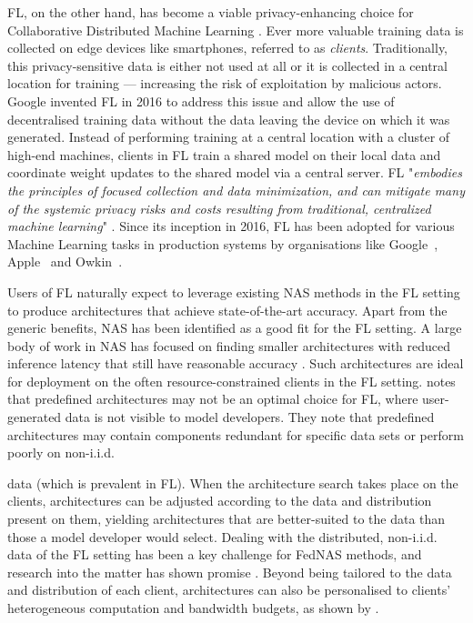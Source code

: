 FL, on the other hand, has become a viable privacy-enhancing choice for Collaborative Distributed Machine Learning \cite{cdml_2024}. Ever more valuable training data is collected on edge devices like smartphones, referred to as \textit{clients}. Traditionally, this privacy-sensitive data is either not used at all or it is collected in a central location for training — increasing the risk of exploitation by malicious actors. Google invented FL in 2016 to address this issue and allow the use of decentralised training data without the data leaving the device on which it was generated. Instead of performing training at a central location with a cluster of high-end machines, clients in FL train a shared model on their local data and coordinate weight updates to the shared model via a central server. FL "\textit{embodies the principles of focused collection and data minimization, and can mitigate many of the systemic privacy risks and costs resulting from traditional, centralized machine learning}" \cite{fl_advances_and_open_problems_2021}. Since its inception in 2016, FL has been adopted for various Machine Learning tasks in production systems by organisations like Google~\cite{gboard_fl_2018}, Apple~\cite{apple_fl_case_study_2025} and Owkin~\cite{owkin_fl_drug_discovery_in_prod_2022}.

Users of FL naturally expect to leverage existing NAS methods in the FL setting to produce architectures that achieve state-of-the-art accuracy. Apart from the generic benefits, NAS has been identified as a good fit for the FL setting. A large body of work in NAS has focused on finding smaller architectures with reduced inference latency that still have reasonable accuracy \cite{nas_1000_papers_2023}. Such architectures are ideal for deployment on the often resource-constrained clients in the FL setting. \cite{fl_advances_and_open_problems_2021} notes that predefined architectures may not be an optimal choice for FL, where user-generated data is not visible to model developers. They note that predefined architectures may contain components redundant for specific data sets or perform poorly on non-i.i.d.

data (which is prevalent in FL). When the architecture search takes place on the clients, architectures can be adjusted according to the data and distribution present on them, yielding architectures that are better-suited to the data than those a model developer would select. Dealing with the distributed, non-i.i.d. data of the FL setting has been a key challenge for FedNAS methods, and research into the matter has shown promise \cite{fednas_2021} \cite{rl_fednas_2021} \cite{fedoras_2022} \cite{finch_2024} \cite{peaches_2024}. Beyond being tailored to the data and distribution of each client, architectures can also be personalised to clients' heterogeneous computation and bandwidth budgets, as shown by \cite{superfednas_2024} \cite{fedoras_2022} \cite{perfedrlnas_2024} \cite{decnas_2022}. 

